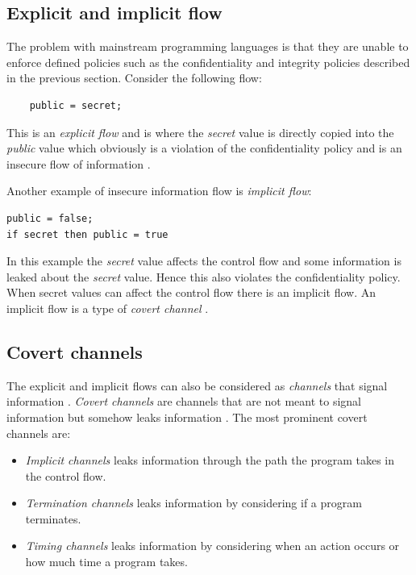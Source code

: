 \subsection{Explicit and implicit flow}\label{explicitimplicit}
The problem with mainstream programming languages is that they are unable to enforce defined policies such as the confidentiality and integrity policies described in the previous section. Consider the following flow:

\begin{lstlisting}
	public = secret;
\end{lstlisting}

This is an \emph{explicit flow} and is where the \emph{secret} value is directly copied into the \emph{public} value which obviously is a violation of the confidentiality policy and is an insecure flow of information \cite{Hedin2011}. 

Another example of insecure information flow is \emph{implicit flow}:

\begin{lstlisting}[language=ALGOL]
public = false;
if secret then public = true
\end{lstlisting}

In this example the \emph{secret} value affects the control flow and some information is leaked about the \emph{secret} value. Hence this also violates the confidentiality policy. When secret values can affect the control flow there is an implicit flow. An implicit flow is a type of \emph{covert channel} \cite{Sabelfeld2003}.

\subsection{Covert channels} The explicit and implicit flows can also be considered as \emph{channels} that signal information \cite{Kashyap2011} \cite{Sabelfeld2003}. \emph{Covert channels} are channels that are not meant to signal information but somehow leaks information \cite{Kashyap2011}. The most prominent covert channels are: 
\begin{itemize}
	\item \emph{Implicit channels} leaks information through the path the program takes in the control flow.
	\item \emph{Termination channels} leaks information by considering if a program terminates.
	\item \emph{Timing channels} leaks information by considering when an action occurs or how much time a program takes.
\end{itemize}

